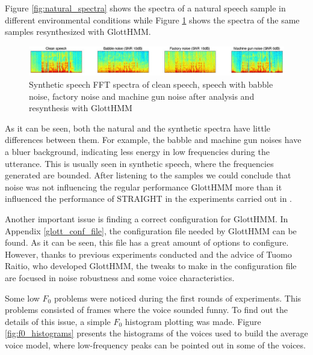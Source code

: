 Figure \ref{fig:natural_spectra} shows the spectra of a natural speech sample in different environmental conditions while Figure \ref{fig:synthetic_spectra} shows the spectra of the same samples resynthesized with GlottHMM.

\begin{figure}[!htb]
\begin{centering}
\includegraphics[width=\textwidth]{images/synthetic_spectra.jpg}
\caption{Synthetic speech FFT spectra of clean speech, speech with babble noise, factory noise and machine gun noise after analysis and resynthesis with GlottHMM}
\label{fig:synthetic_spectra}
\end{centering}
\end{figure}

As it can be seen, both the natural and the synthetic spectra have little differences between them.
%
For example, the babble and machine gun noises have a bluer background, indicating less energy in low frequencies during the utterance.
%
This is usually seen in synthetic speech, where the frequencies generated are bounded.
%
After listening to the samples we could conclude that noise was not influencing the regular performance GlottHMM more than it influenced the performance of STRAIGHT in the experiments carried out in \cite{karhila_jstsp_14}.

Another important issue is finding a correct configuration for GlottHMM.
%
In Appendix \ref{glott_conf_file}, the configuration file needed by GlottHMM can be found.
%
As it can be seen, this file has a great amount of options to configure. 
%
However, thanks to previous experiments conducted and the advice of Tuomo Raitio, who developed GlottHMM, the tweaks to make in the configuration file are focused in noise robustness and some voice characteristics.

Some low $F_{0}$ problems were noticed during the first rounds of experiments.
% 
This problems consisted of frames where the voice sounded funny.
%
To find out the details of this issue, a simple $F_{0}$ histogram plotting was made.
%
Figure \ref{fig:f0_histograms} presents the histograms of the voices used to build the average voice model, where low-frequency peaks can be pointed out in some of the voices.

